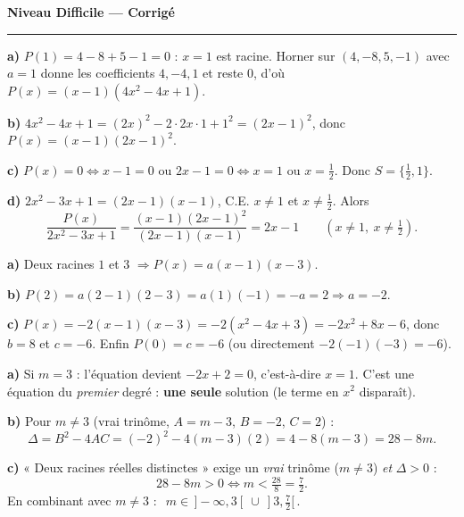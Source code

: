 \documentclass[11pt,a4paper]{article}
\begin{document}
\begin{center}
{\LARGE\bfseries\color{primarydark} Niveau Difficile — Corrigé}\\[2pt]
{\color{primary}\rule{0.45\textwidth}{1.2pt}}
\end{center}
\vspace{1mm}

\begin{corrige}
\textbf{a)} $P(1)=4-8+5-1=0$ : $x=1$ est racine. Horner sur $(4,-8,5,-1)$ avec $a=1$ donne les
coefficients $4,-4,1$ et reste $0$, d'où $P(x)=(x-1)(4x^{2}-4x+1)$.

\smallskip
\textbf{b)} $4x^{2}-4x+1=(2x)^{2}-2\cdot2x\cdot1+1^{2}=(2x-1)^{2}$, donc $P(x)=(x-1)(2x-1)^{2}$.

\smallskip
\textbf{c)} $P(x)=0\Leftrightarrow x-1=0$ ou $2x-1=0\Leftrightarrow x=1$ ou $x=\tfrac12$. Donc $S=\{\tfrac12,1\}$.

\smallskip
\textbf{d)} $2x^{2}-3x+1=(2x-1)(x-1)$, C.E. $x\neq1$ et $x\neq\tfrac12$. Alors
\[ \frac{P(x)}{2x^{2}-3x+1}=\frac{(x-1)(2x-1)^{2}}{(2x-1)(x-1)}=2x-1\qquad(x\neq1,\ x\neq\tfrac12). \]
\end{corrige}

\begin{corrige}
\textbf{a)} Deux racines $1$ et $3$ $\Rightarrow P(x)=a(x-1)(x-3)$.

\smallskip
\textbf{b)} $P(2)=a(2-1)(2-3)=a(1)(-1)=-a=2\Rightarrow a=-2$.

\smallskip
\textbf{c)} $P(x)=-2(x-1)(x-3)=-2(x^{2}-4x+3)=-2x^{2}+8x-6$, donc $b=8$ et $c=-6$.
Enfin $P(0)=c=-6$ (ou directement $-2(-1)(-3)=-6$).
\end{corrige}

\begin{corrige}
\textbf{a)} Si $m=3$ : l'équation devient $-2x+2=0$, c'est-à-dire $x=1$. C'est une équation du
\emph{premier} degré : \textbf{une seule} solution (le terme en $x^{2}$ disparaît).

\smallskip
\textbf{b)} Pour $m\neq3$ (vrai trinôme, $A=m-3$, $B=-2$, $C=2$) :
\[ \Delta=B^{2}-4AC=(-2)^{2}-4(m-3)(2)=4-8(m-3)=28-8m. \]

\smallskip
\textbf{c)} « Deux racines réelles distinctes » exige un \emph{vrai} trinôme ($m\neq3$) \emph{et} $\Delta>0$ :
\[ 28-8m>0\Leftrightarrow m<\tfrac{28}{8}=\tfrac72. \]
En combinant avec $m\neq3$ : $\ \boxed{\,m\in\,]-\infty,3[\ \cup\ ]3,\tfrac72[\,}$.
\end{corrige}
\end{document}
